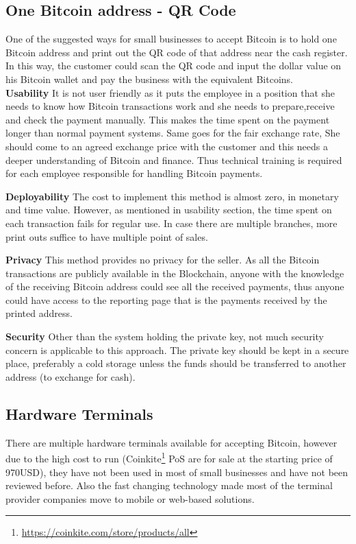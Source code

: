\subsection{One Bitcoin address - QR Code} 
One of the suggested ways for small businesses to accept Bitcoin is to hold one Bitcoin address and print out the QR code of that address near the cash register. In this way, the customer could scan the QR code and input the dollar value on his Bitcoin wallet and pay the business with the equivalent Bitcoins. \\

\textbf{Usability} It is not user friendly as it puts the employee in a position that she needs to know how Bitcoin transactions work and she needs to prepare,receive and check  the payment manually. This makes the time spent on the payment longer than normal payment systems. Same goes for the fair exchange rate, She should come to an agreed exchange price with the customer and this needs a deeper understanding of Bitcoin and finance. Thus technical training is required for each employee responsible for handling Bitcoin payments.

\textbf{Deployability} The cost to implement this method is almost zero, in monetary and time value. However, as mentioned in usability section, the time spent on each transaction fails for regular use. In case there are multiple branches, more print outs suffice to have multiple point of sales.

\textbf{Privacy} This method provides no privacy for the seller. As all the Bitcoin transactions are publicly available in the Blockchain, anyone with the knowledge of the receiving Bitcoin address could see all the received payments, thus anyone could have access to the reporting page that is the payments received by the printed address.

\textbf{Security} Other than the system holding the private key, not much security concern is applicable to this approach. The private key should be kept in a secure place, preferably a cold storage unless the funds should be transferred to another address (\eg to exchange for cash).

\subsection{Hardware Terminals}
There are multiple hardware terminals available for accepting Bitcoin, however due to the high cost to run (\eg Coinkite\footnote{\url{https://coinkite.com/store/products/all}} PoS are for sale at the starting price of 970USD), they have not been used in most of small businesses and have not been reviewed before. Also the fast changing technology made most of the terminal provider companies move to mobile or web-based solutions.


